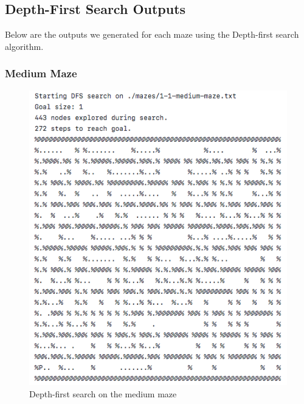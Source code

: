 \documentclass[titlepage]{article}
\begin{document}
\newpage

\subsection{Depth-First Search Outputs}
Below are the outputs we generated for each maze using the Depth-first search algorithm. 
\subsubsection{Medium Maze}
\begin{figure}[h!]
\includegraphics[width=\linewidth]{dfsmedium.png}
\caption{Depth-first search on the medium maze}
\label{fig:DFSmedium}
\end{figure}

\newpage
\end{document}
